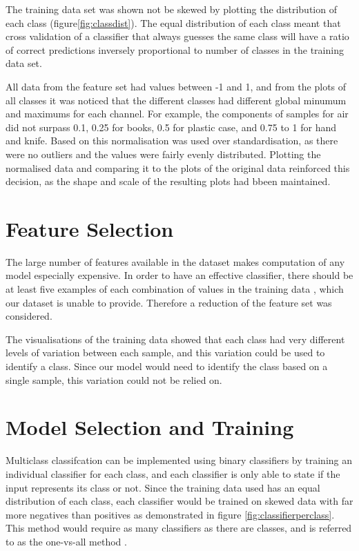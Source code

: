 \documentclass[12pt]{article}
\begin{document}
The training data set was shown not be skewed by plotting the distribution of each class (figure\ref{fig:classdist}). The equal distribution of each class meant that cross validation of a classifier that always guesses the same class will have a ratio of correct predictions inversely proportional to number of classes in the training data set. 

All data from the feature set had values between -1 and 1, and from the plots of all classes it was noticed that the different classes had different global minumum and maximums for each channel. For example, the components of samples for air did not surpass 0.1, 0.25 for books, 0.5 for plastic case, and 0.75 to 1 for hand and knife. Based on this normalisation was used over standardisation, as there were no outliers and the values were fairly evenly distributed. Plotting the normalised data and comparing it to the plots of the original data reinforced this decision, as the shape and scale of the resulting plots had bbeen maintained.

\section{Feature Selection}

The large number of features available in the dataset makes computation of any model especially expensive. In order to have an effective classifier, there should be at least five examples of each combination of values in the training data \cite{mincombs}, which our dataset is unable to provide. Therefore a reduction of the feature set was considered.

The visualisations of the training data showed that each class had very different levels of variation between each sample, and this variation could be used to identify a class. Since our model would need to identify the class based on a single sample, this variation could not be relied on. 

\section{Model Selection and Training}

Multiclass classifcation can be implemented using binary classifiers by training an individual classifier for each class, and each classifier is only able to state if the input represents its class or not. Since the training data used has an equal distribution of each class, each classifier would be trained on skewed data with far more negatives than positives as demonstrated in figure \ref{fig:classifierperclass}. This method would require as many classifiers as there are classes, and is referred to as the one-vs-all method \cite{handson}.
\end{document}

